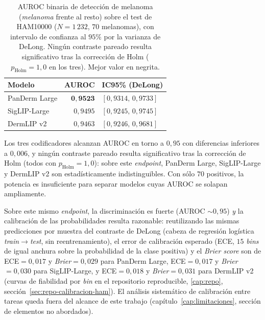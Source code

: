 \begin{table}[htbp]
\centering
\footnotesize
\setlength{\tabcolsep}{4pt}
\renewcommand{\arraystretch}{0.95}
\caption{AUROC binaria de detección de melanoma (\emph{melanoma} frente
al resto) sobre el test de HAM10000 ($N = 1\,232$, $70$ melanomas), con
intervalo de confianza al $95\%$ por la varianza de DeLong. Ningún
contraste pareado resulta significativo tras la corrección de Holm
($p_{\mathrm{Holm}} = 1{,}0$ en los tres). Mejor valor en negrita.}
\label{tab:delong-ham}
\begin{tabular}{lrl}
\hline
Modelo          & AUROC               & IC95\% (DeLong) \\
\hline
PanDerm Large   & $\mathbf{0{,}9523}$ & $[0{,}9314,\, 0{,}9733]$ \\
SigLIP-Large    & $0{,}9495$          & $[0{,}9245,\, 0{,}9745]$ \\
DermLIP v2      & $0{,}9463$          & $[0{,}9246,\, 0{,}9681]$ \\
\hline
\end{tabular}
\end{table}

Los tres codificadores alcanzan AUROC en torno a $0{,}95$ con
diferencias inferiores a $0{,}006$, y ningún contraste pareado resulta
significativo tras la corrección de Holm (todos con $p_{\mathrm{Holm}} =
1{,}0$): sobre este \emph{endpoint}, PanDerm Large, SigLIP-Large y
DermLIP v2 son estadísticamente indistinguibles. Con sólo $70$
positivos, la potencia es insuficiente para separar modelos cuyas AUROC
se solapan ampliamente.

Sobre este mismo \emph{endpoint}, la discriminación es fuerte
(AUROC $\sim 0{,}95$) \emph{y} la calibración de las probabilidades
resulta razonable: reutilizando las mismas predicciones por muestra
del contraste de DeLong (cabeza de regresión logística \emph{train}$\to$\emph{test},
sin reentrenamiento), el error de calibración esperado
(ECE, $15$ \emph{bins} de igual anchura sobre la probabilidad de la
clase positiva) y el \emph{Brier score} son de
ECE${}=0{,}017$ y \emph{Brier}${}=0{,}029$ para PanDerm Large,
ECE${}=0{,}017$ y \emph{Brier}${}=0{,}030$ para SigLIP-Large, y
ECE${}=0{,}018$ y \emph{Brier}${}=0{,}031$ para DermLIP v2 (curvas de
fiabilidad por \emph{bin} en el repositorio reproducible,
\ref{cap:repo}, sección~\ref{sec:repo-calibracion-ham}). El análisis
sistemático de calibración entre tareas queda fuera del alcance de este
trabajo (capítulo~\ref{cap:limitaciones}, sección de elementos no
abordados).

